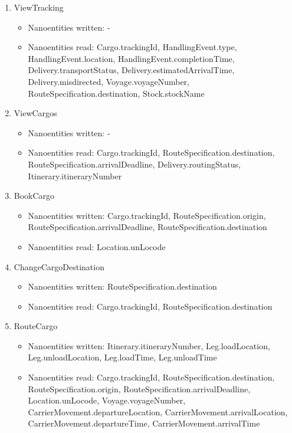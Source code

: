 \begin{enumerate}
	\item ViewTracking
	\begin{itemize}
		\item Nanoentities written: -
		\item Nanoentities read: Cargo.trackingId, HandlingEvent.type, HandlingEvent.location, HandlingEvent.completionTime, Delivery.transportStatus, Delivery.estimatedArrivalTime, Delivery.misdirected, Voyage.voyageNumber, RouteSpecification.destination, Stock.stockName
	\end{itemize}
	
	\item ViewCargos
	\begin{itemize}
		\item Nanoentities written: -
		\item Nanoentities read: Cargo.trackingId, RouteSpecification.destination, RouteSpecification.arrivalDeadline, Delivery.routingStatus, Itinerary.itineraryNumber
	\end{itemize}
	
	\item BookCargo
	\begin{itemize}
		\item Nanoentities written: Cargo.trackingId, RouteSpecification.origin, RouteSpecification.arrivalDeadline, RouteSpecification.destination
		\item Nanoentities read: Location.unLocode
	\end{itemize}
	
	\item ChangeCargoDestination
	\begin{itemize}
		\item Nanoentities written: RouteSpecification.destination
		\item Nanoentities read: Cargo.trackingId, RouteSpecification.destination
	\end{itemize}
	
	\item RouteCargo
	\begin{itemize}
		\item Nanoentities written: Itinerary.itineraryNumber, Leg.loadLocation, Leg.unloadLocation, Leg.loadTime, Leg.unloadTime
		\item Nanoentities read: Cargo.trackingId, RouteSpecification.destination, RouteSpecification.origin, RouteSpecification.arrivalDeadline, Location.unLocode, Voyage.voyageNumber, CarrierMovement.departureLocation, CarrierMovement.arrivalLocation, CarrierMovement.departureTime, CarrierMovement.arrivalTime
	\end{itemize}
	

\end{enumerate}
